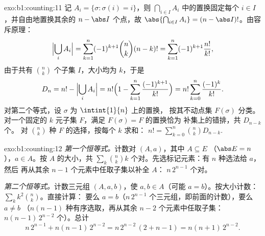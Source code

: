 \begin{solution}{exo:b1:counting:11}
记 $A_i = \{\sigma : \sigma(i) = i\}$，则
$\bigcap_{i \in I} A_i$ 中的置换固定每个 $i \in I$，并自由地置换其余的
$n - \abs I$ 个点，故 $\abs{\bigcap_{i \in I} A_i} =
(n - \abs I)!$。由容斥原理：
\[
\Bigl|\bigcup_i A_i\Bigr|
= \sum_{k=1}^{n} (-1)^{k+1} \binom nk (n-k)!
= \sum_{k=1}^{n} (-1)^{k+1} \frac{n!}{k!} ,
\]
由于共有 $\binom nk$ 个子集 $I$，大小均为 $k$，于是
\[
D_n = n! - \Bigl|\bigcup_i A_i\Bigr|
= n!\Bigl(1 - \sum_{k=1}^{n} \frac{(-1)^{k+1}}{k!}\Bigr)
= n! \sum_{k=0}^{n} \frac{(-1)^k}{k!} .
\]
对第二个等式，设 $\sigma$ 为 $\intint{1}{n}$ 上的置换，
按其不动点集 $F(\sigma)$ 分类。对一个固定的
$k$ 元子集 $F$，满足 $F(\sigma) = F$ 的置换恰为
补集上的错排，共 $D_{n-k}$ 个。
对 $\binom nk$ 种 $F$ 的选择，按每个 $k$ 求和：
$n! = \sum_{k=0}^{n} \binom nk D_{n-k}$.
\end{solution}

\begin{solution}{exo:b1:counting:12}
\emph{第一个恒等式。}计数对 $(A, a)$，其中 $A \subseteq E$
（$\abs E = n$），$a \in A$。按 $A$ 的大小，共 $\sum_k \binom nk k$
个对。先选标记元素：有 $n$ 种选法给 $a$，然后
再从其余 $n - 1$ 个元素中任取子集以补全 $A$：
$n\,2^{n-1}$ 个对。

\emph{第二个恒等式。}计数三元组 $(A, a, b)$，使 $a, b \in
A$（可能 $a = b$）。按大小计数：$\sum_k k^2 \binom nk$。直接计算：
要么 $a = b$（$n\,2^{n-1}$ 个三元组，即前面的计数），要么 $a \neq b$
（$n(n-1)$ 种有序选取，再从其余 $n - 2$
个元素中任取子集：$n(n-1)\,2^{n-2}$ 个）。总计
\[
n\,2^{n-1} + n(n-1)\,2^{n-2} = n\,2^{n-2}\,(2 + n - 1)
= n(n+1)\,2^{n-2} .
\]
\end{solution}

